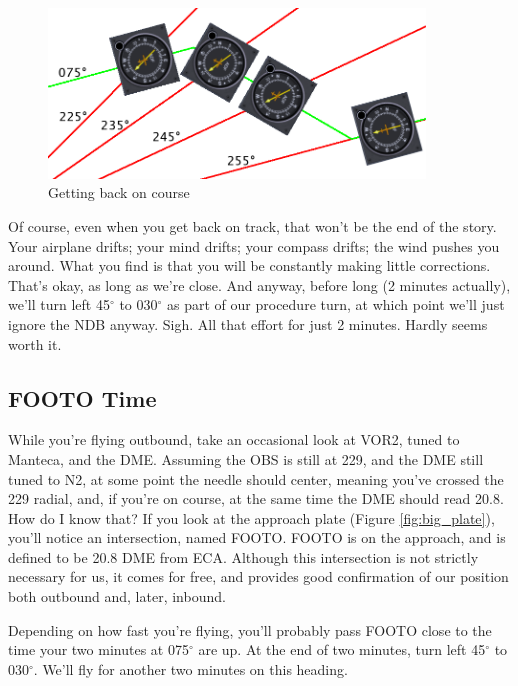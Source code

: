 \begin{figure}
  \begin{center}
    \includegraphics[width=10cm]{img/NDB_flying.png}
    \caption{Getting back on course}
    \label{fig:NDB_flying}
  \end{center}
\end{figure}

Of course, even when you get back on track, that won't be the end of
the story.  Your airplane drifts; your mind drifts; your compass
drifts; the wind pushes you around.  What you find is that you will be
constantly making little corrections.  That's okay, as long as we're
close.  And anyway, before long (2 minutes actually), we'll turn left
45$^\circ$ to 030$^\circ$ as part of our procedure turn, at which
point we'll just ignore the NDB anyway.  Sigh.  All that effort for
just 2 minutes.  Hardly seems worth it.

\subsection{FOOTO Time}

While you're flying outbound, take an occasional look at VOR2, tuned
to Manteca, and the DME.  Assuming the OBS is still at 229, and the
DME still tuned to N2, at some point the needle should center, meaning
you've crossed the 229 radial, and, if you're on course, at the same
time the DME should read 20.8.  How do I know that?  If you look at
the approach plate (Figure \ref{fig:big_plate}), you'll notice an
intersection, named FOOTO.  FOOTO is on the approach, and is defined
to be 20.8 DME from ECA.  Although this intersection is not strictly
necessary for us, it comes for free, and provides good confirmation of
our position both outbound and, later, inbound.

Depending on how fast you're flying, you'll probably pass FOOTO close
to the time your two minutes at 075$^\circ$ are up.  At the end of two
minutes, turn left 45$^\circ$ to 030$^\circ$.  We'll fly for another
two minutes on this heading.

